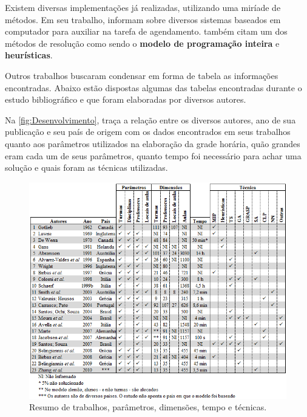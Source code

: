 
Existem diversas implementações já realizadas, utilizando uma miríade de métodos. Em seu trabalho,  informam sobre diversos sistemas baseados em computador para auxiliar na tarefa de agendamento.  também citam um dos métodos de resolução como sendo o \textbf{modelo de programação inteira} e \textbf{heurísticas}.

Outros trabalhos buscaram condensar em forma de tabela as informações encontradas. Abaixo estão dispostas algumas das tabelas encontradas durante o estudo bibliográfico e que foram elaboradas por diversos autores.

Na \autoref{fig:Desenvolvimento},  traça a relação entre os diversos autores, ano de sua publicação e seu país de origem com os dados encontrados em seus trabalhos quanto aos parâmetros utilizados na elaboração da grade horária, quão grandes eram cada um de seus parâmetros, quanto tempo foi necessário para achar uma solução e quais foram as técnicas utilizadas.


\begin{figure}[htbp]\centering
  \caption{Resumo de trabalhos, parâmetros, dimensões, tempo e técnicas.}
  \label{fig:Desenvolvimento}
  \includegraphics[width=\textwidth]{files/img/Tabelas/Desenvolvimento}
\end{figure}    %

